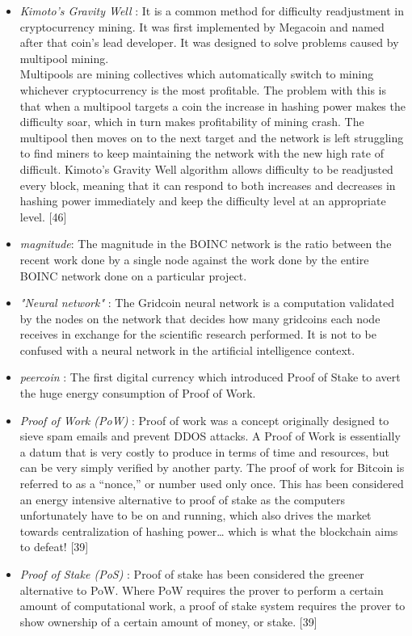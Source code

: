 \begin{itemize}
  \item \textit{Kimoto's Gravity Well} : It is a common method for difficulty readjustment in cryptocurrency mining. 
  It was first implemented by Megacoin and named after that coin’s lead developer. It was designed to solve problems caused by multipool mining.\\
  Multipools are mining collectives which automatically switch to mining whichever cryptocurrency is the most profitable. The problem with this is that when a multipool targets a coin the increase in hashing power makes the difficulty soar, which in turn makes profitability of mining crash. The multipool then moves on to the next target and the network is left struggling to find miners to keep maintaining the network with the new high rate of difficult. Kimoto’s Gravity Well algorithm allows difficulty to be readjusted every block, meaning that it can respond to both increases and decreases in hashing power immediately and keep the difficulty level at an appropriate level. [46]
  \item \textit{magnitude}: The magnitude in the BOINC network is the ratio between the recent work done by a single node against the work done by the entire BOINC network done on a particular project.
  \item \textit{"Neural network"} : The Gridcoin neural network is a computation validated by the nodes on the network that decides how many gridcoins each node receives in exchange for the scientific research performed. It is not to be confused with a neural network in the artificial intelligence context.
  \item \textit{peercoin} : The first digital currency which introduced Proof of Stake to avert the huge energy consumption of Proof of Work.
  \item \textit{Proof of Work (PoW)} : Proof of work was a concept originally designed to sieve spam emails and prevent DDOS attacks. A Proof of Work is essentially a datum that is very costly to produce in terms of time and resources, but can be very simply verified by another party. The proof of work for Bitcoin is referred to as a “nonce,” or number used only once. This has been considered an energy intensive alternative to proof of stake as the computers unfortunately have to be on and running, which also drives the market towards centralization of hashing power… which is what the blockchain aims to defeat! [39]
  \item \textit{Proof of Stake (PoS)} : Proof of stake has been considered the greener alternative to PoW. Where PoW requires the prover to perform a certain amount of computational work, a proof of stake system requires the prover to show ownership of a certain amount of money, or stake. [39]

\end{itemize}
